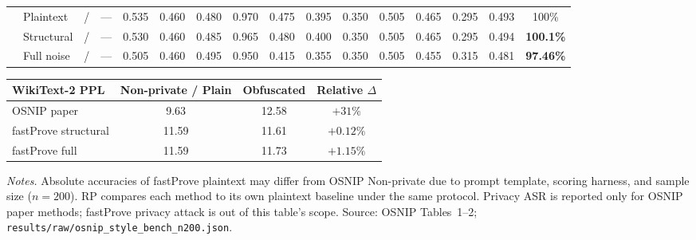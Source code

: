 \documentclass[10pt]{article}
\begin{document}
\begin{center}
\begin{tabular}{@{}ll c c *{10}{c} c c@{}}
 & Plaintext & / & ---
 & 0.535 & 0.460 & 0.480 & 0.970 & 0.475 & 0.395 & 0.350 & 0.505 & 0.465 & 0.295
 & 0.493 & 100\% \\
 & Structural & / & ---
 & 0.530 & 0.460 & 0.485 & 0.965 & 0.480 & 0.400 & 0.350 & 0.505 & 0.465 & 0.295
 & 0.494 & \textbf{100.1\%} \\
 & Full noise & / & ---
 & 0.505 & 0.460 & 0.495 & 0.950 & 0.415 & 0.355 & 0.350 & 0.505 & 0.455 & 0.315
 & 0.481 & \textbf{97.46\%} \\
\bottomrule
\end{tabular}
\end{center}

\vspace{0.7em}
\begin{center}
\renewcommand{\arraystretch}{1.2}
\small
\begin{tabular}{@{}lccc@{}}
\toprule
\rowcolor{headerbg}
\textbf{WikiText-2 PPL} & Non-private / Plain & Obfuscated & Relative $\Delta$ \\
\midrule
OSNIP paper & 9.63 & 12.58 & $+31\%$ \\
fastProve structural & 11.59 & 11.61 & $+0.12\%$ \\
fastProve full & 11.59 & 11.73 & $+1.15\%$ \\
\bottomrule
\end{tabular}
\end{center}

\vspace{0.5em}
{\scriptsize\noindent
\textit{Notes.}
Absolute accuracies of fastProve plaintext may differ from OSNIP Non-private due to prompt template,
scoring harness, and sample size ($n{=}200$).
RP compares each method to its own plaintext baseline under the same protocol.
Privacy ASR is reported only for OSNIP paper methods; fastProve privacy attack is out of this table's scope.
Source: OSNIP Tables~1--2; \texttt{results/raw/osnip\_style\_bench\_n200.json}.
}
\end{document}
